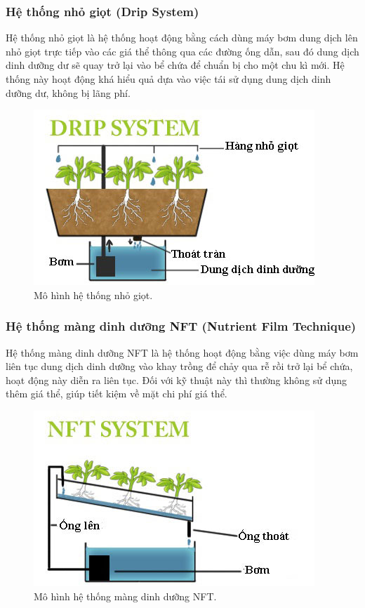 \documentclass[a4paper,12pt,oneside]{article}
\begin{document}
\subsubsection{Hệ thống nhỏ giọt (Drip System)}
\noindent Hệ thống nhỏ giọt là hệ thống hoạt động bằng cách dùng máy bơm dung dịch lên nhỏ giọt trực tiếp vào các giá thể thông qua các đường ống dẫn, sau đó dung dịch dinh dưỡng dư sẽ quay trở lại vào bể chứa để chuẩn bị cho một chu kì mới. Hệ thống này hoạt động khá hiểu quả dựa vào việc tái sử dụng dung dịch dinh dưỡng dư, không bị lãng phí.

\begin{figure}[H]
	\centering
	\includegraphics[scale=.9]{hinh/Drip_system.jpg}
	\caption{Mô hình hệ thống nhỏ giọt\cite{thuycanh}.}
	\label{fig:Drip_system}
\end{figure}


\subsubsection{Hệ thống màng dinh dưỡng NFT (Nutrient Film Technique)}
\noindent Hệ thống màng dinh dưỡng NFT là hệ thống hoạt động bằng việc dùng máy bơm liên tục dung dịch dinh dưỡng vào khay trồng để chảy qua rễ rồi trở lại bể chứa, hoạt động này diễn ra liên tục. Đối với kỹ thuật này thì thường không sử dụng thêm giá thể, giúp tiết kiệm về mặt chi phí giá thể.


\begin{figure}[H]
	\centering
	\includegraphics[scale=.8]{hinh/NFT_system.jpg}
	\caption{Mô hình hệ thống màng dinh dưỡng NFT\cite{thuycanh}.}
	\label{fig:NFT_system}
\end{figure}
\end{document}
